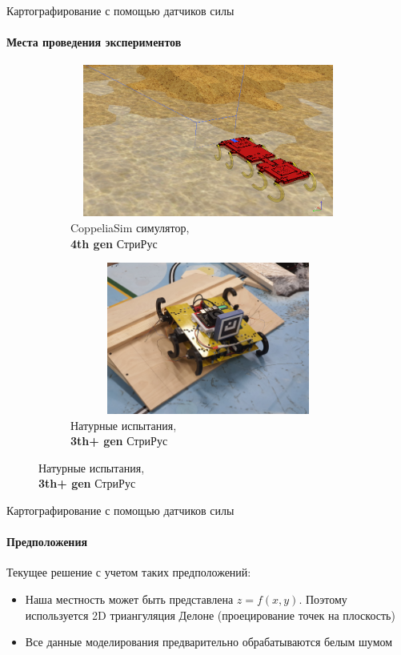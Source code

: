 \documentclass[aspectratio=169,xcolor=table]{beamer}
\begin{document}
\begin{frame}[t]{Картографирование с помощью датчиков силы}
    \framesubtitle{Места проведения экспериментов}
    \vspace{-15pt}
    \begin{figure}[H]
        \begin{subfigure}[t]{0.49\textwidth}
            \centering\includegraphics[height=5cm,width=1\textwidth,keepaspectratio]{coppelia_sim.png}
            \caption*{CoppeliaSim симулятор,\\ \textbf{4th gen} СтриРус}
        \end{subfigure}
        \begin{subfigure}[t]{0.49\textwidth}
            \centering\includegraphics[height=5cm,width=1\textwidth,keepaspectratio]{rl_sim.JPG}
            \caption*{Натурные испытания,\\ \textbf{3th+ gen} СтриРус}
        \end{subfigure}
    \end{figure}
\end{frame}

\begin{frame}[t]{Картографирование с помощью датчиков силы}
    \framesubtitle{Предположения}
    \large
    Текущее решение с учетом таких предположений:
    \begin{itemize}
        \item Наша местность может быть представлена $z = f(x,y)$. Поэтому используется 2D триангуляция Делоне (проецирование точек на плоскость)
        \item Все данные моделирования предварительно обрабатываются белым шумом
    \end{itemize}
\end{frame}
\end{document}
